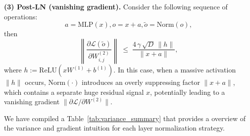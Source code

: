 \begin{proposition}[Informal]
\medskip
\noindent
\textbf{(3) Post-LN (vanishing gradient).} Consider the following sequence of operations:
\begin{equation}
a = \mathrm{MLP}(x), o = x + a, \tilde{o} = \mathrm{Norm}(o),
\end{equation}
then
\begin{equation}
\left\lVert \frac{\partial \mathcal{L}(\tilde{o})}{\partial W_{i,j}^{(2)}} \right\rVert 
\;\le\; \frac{4\,\gamma\,\sqrt{D}\,\|h\|}{\|x + a\|}, 
\end{equation}
where $h := \mathrm{ReLU}\left(x W^{(1)} + b^{(1)}\right)$. In this case, when a massive activation $\|h\|$ occurs, $\mathrm{Norm}(\cdot)$ introduces an overly suppressing factor $\|x+a\|$, which contains a separate huge residual signal $x$, potentially leading to a vanishing gradient $\|\partial \mathcal{L} / \partial W^{(2)}\|$.
\vskip -0.1in
\end{proposition}

We have compiled a Table~\ref{tab:variance_summary} that provides a overview of the variance and gradient intuition for each layer normalization strategy. %


